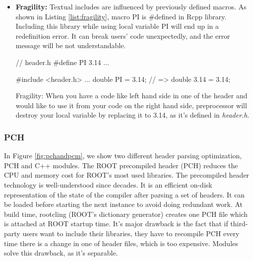 \documentclass{webofc}
\begin{document}
\begin{itemize}
\begin{listing}[h]
\begin{minipage}[h]{.52\textwidth}
\begin{cppcode*}
{{{{{{    int main() {...}
    \end{cppcode*}
    \end{minipage}
    \caption{Example of expansion of textual include: Right hand side is a C++ code of a user, and left hand side is a preprocessed C++ code which will be compiled afterwards.}
    \label{list:expansion-of-textual-include}
\end{listing}

    \item \textbf{Fragility:} Textual includes are influenced by previously defined macros.
    As shown in Listing \ref{list:fragility}, macro PI is \#defined in Rcpp library. Including this library while using local variable PI will end up in a redefinition error. It can break users' code unexpectedly, and the error message will be not understandable.
    
\begin{listing}[h]
    \noindent
    \begin{minipage}[h]{.48\textwidth}
    \begin{cppcode*}{}
    // header.h
    #define PI 3.14
    ...
    \end{cppcode*}
    \end{minipage}\hfill
    \begin{minipage}[h]{.48\textwidth}
    \begin{cppcode*}{}
    #include <header.h>
    ...
    double PI = 3.14;
    // => double 3.14 = 3.14;
    \end{cppcode*}
    \end{minipage}
    \caption{Fragility: When you have a code like left hand side in one of the header and would like to use it from your code on the right hand side, preprocessor will destroy your local variable by replacing it to 3.14, as it's defined in {\it header.h}.}
    \label{list:fragility}
\end{listing}

\end{itemize}

\subsubsection{PCH}

In Figure \ref{fig:pchandpcm}, we show two different header parsing optimization, PCH and C++ modules. The ROOT precompiled header (PCH) reduces the CPU and memory cost for ROOT’s most used libraries. The precompiled header technology is well-understood since decades. It is an efficient on-disk representation of the state of the compiler after parsing a set of headers. It can be loaded before starting the next instance to avoid doing redundant work. At build time, rootcling (ROOT’s dictionary generator) creates one PCH file which is attached at ROOT startup time. It's major drawback is the fact that if third-party users want to include their libraries, they have to recompile PCH every time there is a change in one of header files, which is too expensive. Modules solve this drawback, as it's separable.
\end{document}
